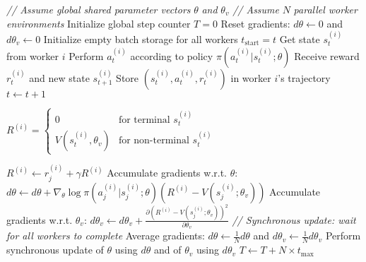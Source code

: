 \begin{algorithmic}
\State \textit{// Assume global shared parameter vectors } $\theta$ \textit{ and } $\theta_v$
\State \textit{// Assume } $N$ \textit{ parallel worker environments}
\State Initialize global step counter $T = 0$
\Repeat
    \State Reset gradients: $d\theta \gets 0$ and $d\theta_v \gets 0$
    \State Initialize empty batch storage for all workers
        \State $t_{\text{start}} = t$
        \State Get state $s_t^{(i)}$ from worker $i$
        \Repeat
            \State Perform $a_t^{(i)}$ according to policy $\pi(a_t^{(i)} | s_t^{(i)}; \theta)$
            \State Receive reward $r_t^{(i)}$ and new state $s_{t+1}^{(i)}$
            \State Store $(s_t^{(i)}, a_t^{(i)}, r_t^{(i)})$ in worker $i$'s trajectory
            \State $t \gets t + 1$
        
        \State $R^{(i)} = 
            \begin{cases}
                0 & \text{for terminal } s_t^{(i)} \\
                V(s_t^{(i)}, \theta_v) & \text{for non-terminal } s_t^{(i)}
            \end{cases}$
        
            \State $R^{(i)} \gets r_j^{(i)} + \gamma R^{(i)}$
            \State Accumulate gradients w.r.t. $\theta$:
            \State \quad $d\theta \gets d\theta + \nabla_{\theta} \log \pi(a_j^{(i)} | s_j^{(i)}; \theta) (R^{(i)} - V(s_j^{(i)}; \theta_v))$
            \State Accumulate gradients w.r.t. $\theta_v$:
            \State \quad $d\theta_v \gets d\theta_v + \frac{\partial (R^{(i)} - V(s_j^{(i)}; \theta_v))^2}{\partial \theta_v}$
        \EndFor
    \EndFor
    \State \textit{// Synchronous update: wait for all workers to complete}
    \State Average gradients: $d\theta \gets \frac{1}{N} d\theta$ and $d\theta_v \gets \frac{1}{N} d\theta_v$
    \State Perform synchronous update of $\theta$ using $d\theta$ and of $\theta_v$ using $d\theta_v$
    \State $T \gets T + N \times t_{\max}$
\end{algorithmic}
